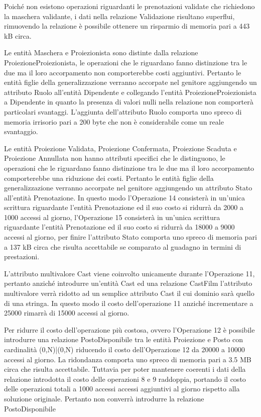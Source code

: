 Poiché non esistono operazioni riguardanti le prenotazioni validate che
richiedono la maschera validante, i dati nella relazione Validazione risultano
superflui, rimuovendo la relazione è possibile ottenere un risparmio di memoria
pari a %
443 kB circa.

Le entità Maschera e Proiezionista sono distinte dalla relazione
ProiezioneProiezionista, le operazioni che le riguardano fanno distinzione tra
le due ma il loro accorpamento non comporterebbe costi aggiuntivi.
Pertanto le entità figlie della generalizzazione verranno accorpate nel
genitore aggiungendo un attributo Ruolo all'entità Dipendente e collegando
l'entità ProiezioneProiezionista a Dipendente in quanto la presenza di valori
nulli nella relazione non comporterà particolari svantaggi.
L'aggiunta dell'attributo Ruolo comporta uno spreco di memoria irrisorio pari a
200 byte che non è considerabile come un reale svantaggio.

Le entità Proiezione Validata, Proiezione Confermata, Proiezione Scaduta e
Proiezione Annullata non hanno attributi specifici che le distinguono,
le operazioni che le riguardano fanno distinzione tra le due ma il loro
accorpamento comporterebbe una riduzione dei costi.
Pertanto le entità figlie della generalizzazione verranno accorpate nel
genitore aggiungendo un attributo Stato all'entità Prenotazione.
In questo modo
l'Operazione 14 consisterà in un'unica scrittura riguardante
l'entità Prenotazione ed il suo costo si ridurrà da 2000 a 1000 accessi
al giorno,
l'Operazione 15 consisterà in un'unica scrittura riguardante
l'entità Prenotazione ed il suo costo si ridurrà da 18000 a 9000 accessi
al giorno,
per finire l'attributo Stato comporta uno spreco di memoria pari a
137 kB circa che risulta accettabile se comparato al guadagno in termini di
prestazioni.

L'attributo multivalore Cast viene coinvolto unicamente durante l'Operazione 11,
pertanto anziché introdurre un'entità Cast ed una relazione CastFilm
l'attributo multivalore verrà ridotto ad un semplice attributo Cast il cui
dominio sarà quello di una stringa.
In questo modo il costo dell'operazione 11 anziché incrementare a 25000
rimarrà di 15000 accessi al giorno.

Per ridurre il costo dell'operazione più costosa, ovvero l'Operazione 12 è
possibile introdurre una relazione PostoDisponibile tra le entità Proiezione e
Posto con cardinalità (0,N)|(0,N) riducendo il costo dell'Operazione 12 da
20000 a 10000 accessi al giorno.
La ridondanza comporta uno spreco di memoria pari a
3.5 MB circa che risulta accettabile.
Tuttavia per poter mantenere coerenti i dati della relazione introdotta il costo
delle operazioni 8 e 9 raddoppia, portando il costo delle operazioni totali a
1000 accessi accessi aggiuntivi al giorno rispetto alla soluzione originale.
Pertanto non converrà introdurre la relazione PostoDisponibile

